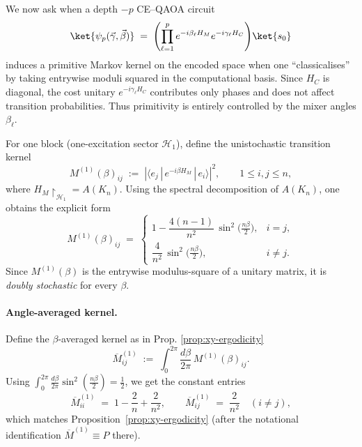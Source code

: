 \documentclass[a4paper,unpublished,onecolumn,11pt]{quantumarticle}
\theoremstyle{definition}
\theoremstyle{remark}
\begin{document}
We now ask when a depth $-p$ CE--QAOA circuit
\[
  \ket{\psi_p(\vec\gamma,\vec\beta)}
  \;=\;
  \Biggl(\prod_{\ell=1}^p e^{-i\beta_\ell H_M} e^{-i\gamma_\ell H_C}\Biggr)\ket{s_0}
\]
induces a primitive Markov kernel on the encoded space when one
``classicalises'' by taking entrywise moduli squared in the
computational basis.  Since $H_C$ is diagonal, the cost unitary
$e^{-i\gamma_\ell H_C}$ contributes only phases and does not affect
transition probabilities. Thus primitivity is entirely controlled by the mixer angles $\beta_\ell$. 

For one block (one-excitation sector $\mathcal H_1$), define the unistochastic transition kernel
\begin{equation}
  M^{(1)}(\beta)_{ij}
  \;:=\;
  \left|\langle e_j \,|\, e^{-i\beta H_M}\,|\, e_i \rangle\right|^{2},
  \qquad 1 \le i,j \le n,
\end{equation}
where $H_M\!\upharpoonright_{\mathcal H_1}=A(K_n)$.
Using the spectral decomposition of $A(K_n)$, one obtains the explicit form
\begin{equation}
\label{eq:M1beta-explicit}
  M^{(1)}(\beta)_{ij}
  \;=\;
  \begin{cases}
    1 - \dfrac{4(n-1)}{n^2}\,\sin^2\!\bigl(\tfrac{n\beta}{2}\bigr),
      & i=j,\\[6pt]
    \dfrac{4}{n^2}\,\sin^2\!\bigl(\tfrac{n\beta}{2}\bigr),
      & i\neq j.
  \end{cases}
\end{equation}
Since $M^{(1)}(\beta)$ is the entrywise modulus-square of a unitary matrix,
it is \emph{doubly stochastic} for every $\beta$.

\paragraph{Angle-averaged kernel.}
Define the $\beta$-averaged kernel as in Prop. \ref{prop:xy-ergodicity}
\begin{equation}
\label{eq:Mbar1-def}
  \overline M^{(1)}_{ij}
  \;:=\;
  \int_{0}^{2\pi} \frac{d\beta}{2\pi}\,M^{(1)}(\beta)_{ij}.
\end{equation}
Using $\int_0^{2\pi}\frac{d\beta}{2\pi}\sin^2(\tfrac{n\beta}{2})=\tfrac12$, we get the constant entries
\begin{equation}
\label{eq:Mbar1-explicit}
  \overline M^{(1)}_{ii}\;=\;1-\frac{2}{n}+\frac{2}{n^2},
  \qquad
  \overline M^{(1)}_{ij}\;=\;\frac{2}{n^2}\quad (i\neq j),
\end{equation}
which matches Proposition~\ref{prop:xy-ergodicity} (after the notational identification
$\overline M^{(1)}\equiv P$ there).
\end{document}
